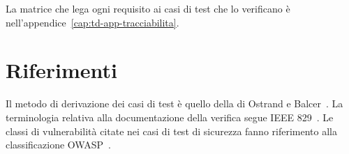 La matrice che lega ogni requisito ai casi di test che lo verificano è
nell'appendice~\ref{cap:td-app-tracciabilita}.

\section{Riferimenti}

Il metodo di derivazione dei casi di test è quello della  di Ostrand e Balcer~\cite{ostrand1988}. La terminologia relativa
alla documentazione della verifica segue IEEE 829~\cite{ieee829}. Le
classi di vulnerabilità citate nei casi di test di sicurezza fanno
riferimento alla classificazione OWASP~\cite{owasp2021}.
